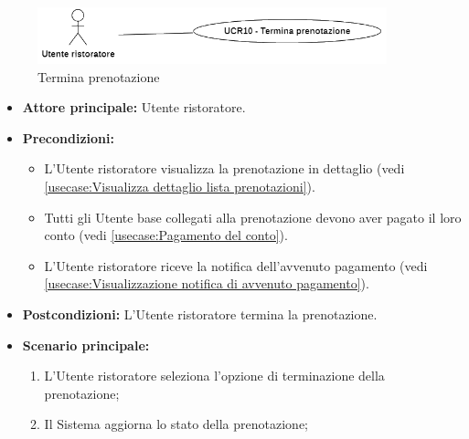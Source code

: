 \newpage
{}
\label{usecase:Termina prenotazione}

\begin{figure}[h]
	\centering
	\includegraphics[width=0.9\textwidth]{./uml/UCR10.png} 
	\caption{Termina prenotazione}
	\label{fig:UCR10}
  \end{figure}

\begin{itemize}
	\item \textbf{Attore principale:} Utente ristoratore.

	\item \textbf{Precondizioni:}
	      \begin{itemize}
		      \item L'Utente ristoratore visualizza la prenotazione in dettaglio (vedi \autoref{usecase:Visualizza dettaglio lista prenotazioni}).
		      \item Tutti gli Utente base collegati alla prenotazione devono aver pagato il loro conto (vedi \autoref{usecase:Pagamento del conto}).
		      \item L'Utente ristoratore riceve la notifica dell'avvenuto pagamento (vedi \autoref{usecase:Visualizzazione notifica di avvenuto pagamento}).
	      \end{itemize}

	\item \textbf{Postcondizioni:} L'Utente ristoratore termina la prenotazione.


	\item \textbf{Scenario principale:}
	      \begin{enumerate}
		      \item L'Utente ristoratore seleziona l'opzione di terminazione della prenotazione;

		      \item Il Sistema aggiorna lo stato della prenotazione;
	      \end{enumerate}
\end{itemize}
